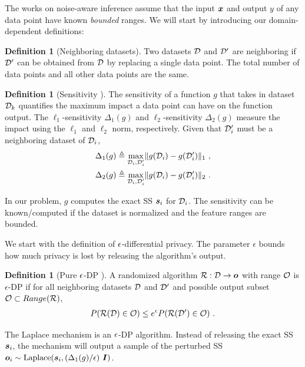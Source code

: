\documentclass{article}
\theoremstyle{plain}
\theoremstyle{definition}
\newtheorem{definition}[theorem]{Definition}
\theoremstyle{remark}
\begin{document}
The works on noise-aware inference  \cite{bernstein2019blr,kulkarni2021glm}  assume that the input ${\bm{x}}$ and output $y$ of any data point have known \emph{bounded} ranges. We will start by introducing our domain-dependent definitions:
\begin{definition}[Neighboring datasets]
Two datasets ${\mathcal{D}}$ and ${\mathcal{D}}'$ are neighboring if ${\mathcal{D}}'$ can be obtained from ${\mathcal{D}}$ by replacing a single data point. The total number of data points and all other data points are the same.
\end{definition}
\begin{definition}[Sensitivity \cite{dp-foundation}]
The sensitivity of a function $g$ that takes in dataset ${\mathcal{D}}_k$ quantifies the maximum impact a data point can have on the function output.
The $\ell_1$-sensitivity $\Delta_1(g)$ and $\ell_2$-sensitivity $\Delta_2(g)$ measure the impact using the $\ell_1$ and $\ell_2$ norm, respectively. Given that ${\mathcal{D}}'_i$ must be a neighboring dataset of ${\mathcal{D}}_i$,
\begin{align*}
    \Delta_1(g) & \triangleq \max_{{\mathcal{D}}_i, {\mathcal{D}}_i'} \lVert g({\mathcal{D}}_i) - g({\mathcal{D}}_i')\rVert_1\ , \\
    \Delta_2(g) & \triangleq \max_{{\mathcal{D}}_i, {\mathcal{D}}_i'} \lVert g({\mathcal{D}}_i) - g({\mathcal{D}}_i')\rVert_2\ .
\end{align*}
\end{definition}
In our problem, $g$ computes the exact SS ${\bm{s}}_i$ for ${\mathcal{D}}_i$. The sensitivity can be known/computed if the dataset is normalized and the feature ranges are bounded.

We start with the definition of ${\epsilon}$-differential privacy. The parameter $\epsilon$ bounds how much privacy is lost by releasing the algorithm's output.

\begin{definition}[Pure ${\epsilon}$-DP \cite{dp-foundation}]
A randomized algorithm $\mathcal{R}: {\mathcal{D}} \rightarrow {\bm{o}}$ with range ${\mathcal{O}}$ is $\epsilon$-DP if for all neighboring datasets ${\mathcal{D}}$ and ${\mathcal{D}}'$ and possible output subset ${\mathcal{O}} \subset \mathop{Range}(\mathcal{R})$, 
\begin{eqnarray*}
P(\mathcal{R}({\mathcal{D}}) \in {\mathcal{O}}) \leq e^\epsilon P(\mathcal{R}({\mathcal{D}}') \in {\mathcal{O}}) \ . 
\end{eqnarray*}
\end{definition}
The Laplace mechanism \cite{dp-foundation} is an ${\epsilon}$-DP algorithm. Instead of releasing the exact SS ${\bm{s}}_i$, the mechanism will output a sample of the perturbed SS ${\bm{o}}_i \sim \mathrm{Laplace}({\bm{s}}_i, (\Delta_1(g) /{\epsilon}) \ {\bm{I}})$. 
\end{document}

